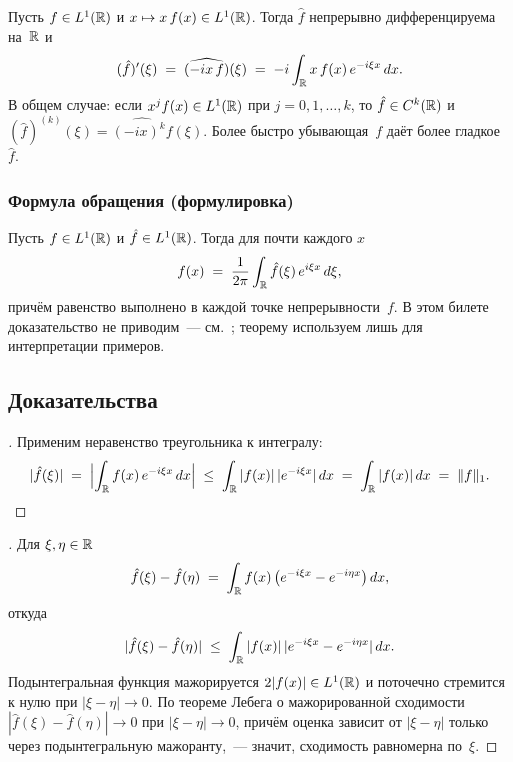\begin{theorem}
\label{thm:derivative-of-ft}
Пусть $f \in L^1(\mathbb{R})$ и $x \mapsto x\, f(x) \in L^1(\mathbb{R})$. Тогда
$\hat f$ непрерывно дифференцируема на~$\mathbb{R}$ и
\[
  (\hat f)'(\xi) \;=\; \widehat{(- i x\, f)}(\xi) \;=\; -i \int_{\mathbb{R}} x\, f(x)\, e^{-i \xi x}\, dx.
\]
В общем случае: если $x^j f(x) \in L^1(\mathbb{R})$ при $j = 0, 1, \dots, k$,
то $\hat f \in C^k(\mathbb{R})$ и
$(\hat f)^{(k)}(\xi) = \widehat{(-i x)^k f}(\xi)$. Более быстро
убывающая~$f$ даёт более гладкое~$\hat f$.
\end{theorem}

\subsubsection*{Формула обращения (формулировка)}

\begin{theorem}
\label{thm:fourier-inversion}
Пусть $f \in L^1(\mathbb{R})$ и $\hat f \in L^1(\mathbb{R})$. Тогда для почти каждого
$x$
\[
  f(x) \;=\; \frac{1}{2\pi} \int_{\mathbb{R}} \hat f(\xi)\, e^{i \xi x}\, d\xi,
\]
причём равенство выполнено в каждой точке непрерывности~$f$. В этом
билете доказательство не приводим~--- см.\
\cite[Т.~II, гл.~XVIII, \S~3]{Zorich1981}; теорему используем лишь для
интерпретации примеров.
\end{theorem}

\subsection*{Доказательства}

\begin{proof}[]
Применим неравенство треугольника к интегралу:
\[
  |\hat f(\xi)| \;=\; \Bigl| \int_{\mathbb{R}} f(x)\, e^{-i \xi x}\, dx \Bigr|
  \;\leq\; \int_{\mathbb{R}} |f(x)|\, |e^{-i \xi x}|\, dx
  \;=\; \int_{\mathbb{R}} |f(x)|\, dx
  \;=\; \|f\|_1.
\]
\end{proof}

\begin{proof}[]
Для $\xi, \eta \in \mathbb{R}$
\[
  \hat f(\xi) - \hat f(\eta)
  \;=\; \int_{\mathbb{R}} f(x)\, \bigl(e^{-i \xi x} - e^{-i \eta x}\bigr)\, dx,
\]
откуда
\[
  |\hat f(\xi) - \hat f(\eta)|
  \;\leq\; \int_{\mathbb{R}} |f(x)|\, |e^{-i \xi x} - e^{-i \eta x}|\, dx.
\]
Подынтегральная функция мажорируется $2 |f(x)| \in L^1(\mathbb{R})$ и
поточечно стремится к нулю при $|\xi - \eta| \to 0$. По теореме
Лебега о мажорированной сходимости
$|\hat f(\xi) - \hat f(\eta)| \to 0$ при $|\xi - \eta| \to 0$, причём
оценка зависит от $|\xi - \eta|$ только через подынтегральную
мажоранту,~--- значит, сходимость равномерна по~$\xi$.
\end{proof}

